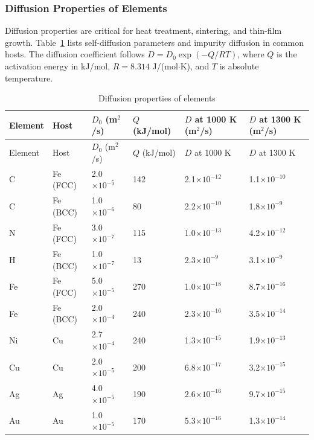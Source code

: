 \documentclass[12pt,a4paper]{article}
\begin{document}
	\subsubsection{Diffusion Properties of Elements}
	\label{subsec:diffusion-properties-func}
	
	Diffusion properties are critical for heat treatment, sintering, and thin-film growth. Table~\ref{tab:diffusion-properties-func} lists self-diffusion parameters and impurity diffusion in common hosts. The diffusion coefficient follows \(D = D_0 \exp(-Q/RT)\), where \(Q\) is the activation energy in kJ/mol, \(R = 8.314\) J/(mol\(\cdot\)K), and \(T\) is absolute temperature.
	
	\begin{longtable}{p{1.2cm}p{1.2cm}p{2.0cm}p{2.5cm}p{2.5cm}p{2.5cm}}
		\caption{Diffusion properties of elements} \label{tab:diffusion-properties-func} \\
		\toprule
		Element & Host & \(D_0\) (m\(^2\)/s) & \(Q\) (kJ/mol) & \(D\) at 1000 K (m\(^2\)/s) & \(D\) at 1300 K (m\(^2\)/s) \\
		\midrule
		\endfirsthead
		\toprule
		Element & Host & \(D_0\) (m\(^2\)/s) & \(Q\) (kJ/mol) & \(D\) at 1000 K & \(D\) at 1300 K \\
		\midrule
		\endhead
		C & Fe (FCC) & 2.0\(\times10^{-5}\) & 142 & 2.1\(\times10^{-12}\) & 1.1\(\times10^{-10}\) \\
		C & Fe (BCC) & 1.0\(\times10^{-6}\) & 80 & 2.2\(\times10^{-10}\) & 1.8\(\times10^{-9}\) \\
		N & Fe (FCC) & 3.0\(\times10^{-7}\) & 115 & 1.0\(\times10^{-13}\) & 4.2\(\times10^{-12}\) \\
		H & Fe (BCC) & 1.0\(\times10^{-7}\) & 13 & 2.3\(\times10^{-9}\) & 3.1\(\times10^{-9}\) \\
		Fe & Fe (FCC) & 5.0\(\times10^{-5}\) & 270 & 1.0\(\times10^{-18}\) & 8.7\(\times10^{-16}\) \\
		Fe & Fe (BCC) & 2.0\(\times10^{-4}\) & 240 & 2.3\(\times10^{-16}\) & 3.5\(\times10^{-14}\) \\
		Ni & Cu & 2.7\(\times10^{-4}\) & 240 & 1.3\(\times10^{-15}\) & 1.9\(\times10^{-13}\) \\
		Cu & Cu & 2.0\(\times10^{-5}\) & 200 & 6.8\(\times10^{-17}\) & 3.2\(\times10^{-15}\) \\
		Ag & Ag & 4.0\(\times10^{-5}\) & 190 & 2.6\(\times10^{-16}\) & 9.7\(\times10^{-15}\) \\
		Au & Au & 1.0\(\times10^{-5}\) & 170 & 5.3\(\times10^{-16}\) & 1.3\(\times10^{-14}\) \\

\end{longtable}
\end{document}
